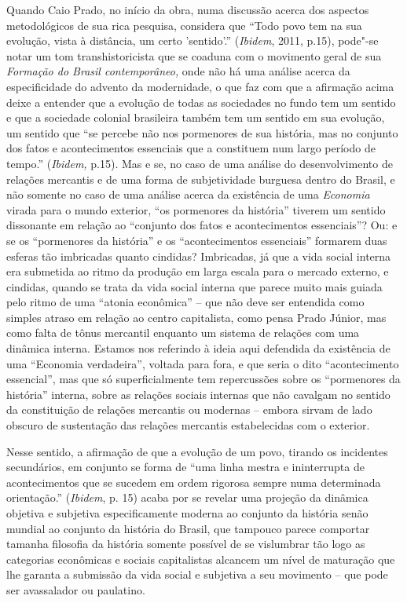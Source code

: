 Quando Caio Prado, no início da obra, numa discussão acerca dos aspectos
metodológicos de sua rica pesquisa, considera que ``Todo povo tem na sua
evolução, vista à distância, um certo 'sentido'.'' (\emph{Ibidem}, 2011,
p.15), pode"-se notar um tom transhistoricista que se coaduna com o
movimento geral de sua \emph{Formação do Brasil contemporâneo,} onde não
há uma análise acerca da especificidade do advento da modernidade, o que
faz com que a afirmação acima deixe a entender que a evolução de todas
as sociedades no fundo tem um sentido e que a sociedade colonial
brasileira também tem um sentido em sua evolução, um sentido que ``se
percebe não nos pormenores de sua história, mas no conjunto dos fatos e
acontecimentos essenciais que a constituem num largo período de tempo.''
(\emph{Ibidem,} p.15). Mas e se, no caso de uma análise do
desenvolvimento de relações mercantis e de uma forma de subjetividade
burguesa dentro do Brasil, e não somente no caso de uma análise acerca
da existência de uma \emph{Economia} virada para o mundo exterior, ``os
pormenores da história'' tiverem um sentido dissonante em relação ao
``conjunto dos fatos e acontecimentos essenciais''? Ou: e se os
``pormenores da história'' e os ``acontecimentos essenciais'' formarem
duas esferas tão imbricadas quanto cindidas? Imbricadas, já que a vida
social interna era submetida ao ritmo da produção em larga escala para o
mercado externo, e cindidas, quando se trata da vida social interna que
parece muito mais guiada pelo ritmo de uma ``atonia econômica'' -- que
não deve ser entendida como simples atraso em relação ao centro
capitalista, como pensa Prado Júnior, mas como falta de tônus mercantil
enquanto um sistema de relações com uma dinâmica interna. Estamos nos
referindo à ideia aqui defendida da existência de uma ``Economia
verdadeira'', voltada para fora, e que seria o dito ``acontecimento
essencial'', mas que só superficialmente tem repercussões sobre os
``pormenores da história'' interna, sobre as relações sociais internas
que não cavalgam no sentido da constituição de relações mercantis ou
modernas -- embora sirvam de lado obscuro de sustentação das relações
mercantis estabelecidas com o exterior.

Nesse sentido, a afirmação de que a evolução de um povo, tirando os
incidentes secundários, em conjunto se forma de ``uma linha mestra e
ininterrupta de acontecimentos que se sucedem em ordem rigorosa sempre
numa determinada orientação.'' (\emph{Ibidem}, p. 15) acaba por se
revelar uma projeção da dinâmica objetiva e subjetiva especificamente
moderna ao conjunto da história senão mundial ao conjunto da história do
Brasil, que tampouco parece comportar tamanha filosofia da história
somente possível de se vislumbrar tão logo as categorias econômicas e
sociais capitalistas alcancem um nível de maturação que lhe garanta a
submissão da vida social e subjetiva a seu movimento -- que pode ser
avassalador ou paulatino.

